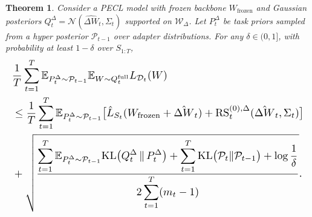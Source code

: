 \documentclass{article}
\theoremstyle{plain}
\newtheorem{theorem}{Theorem}[section]
\theoremstyle{definition}
\theoremstyle{remark}
\begin{document}
\begin{theorem}
\label{thm:pecl-bound}
Consider a PECL model with frozen backbone $W_{\mathrm{frozen}}$ and Gaussian posteriors 
$Q_t^\Delta = \mathcal N(\hat{\Delta W}_t,\Sigma_t)$ supported on $\mathcal W_\Delta$. 
Let $P_t^\Delta$ be task priors sampled from a hyper posterior $\mathcal P_{t-1}$ over adapter 
distributions. For any $\delta\in(0,1]$, with probability at least $1-\delta$ over $S_{1:T}$,
\begin{equation*}
\label{eq:pecl-main-bound}
\resizebox{\linewidth}{!}{$
\begin{aligned}
&\frac{1}{T}\sum_{t=1}^T
\mathbb E_{P_t^\Delta\sim\mathcal P_{t-1}}
\mathbb E_{W\sim Q_t^{\mathrm{full}}}
L_{\mathcal D_t}(W) \\
&\le
\frac{1}{T}\sum_{t=1}^T
\mathbb E_{P_t^\Delta\sim\mathcal P_{t-1}}
\bigl[
\hat L_{S_t}(W_{\mathrm{frozen}} + \hat{\Delta W}_t)
+
\mathrm{RS}_t^{(0),\Delta}(\hat{\Delta W}_t,\Sigma_t)
\bigr] \\
&+
\sqrt{
\frac{
\displaystyle
\sum_{t=1}^T
\mathbb E_{P_t^\Delta\sim\mathcal P_{t-1}}
\mathrm{KL}\bigl(Q_t^\Delta \,\Vert\, P_t^\Delta\bigr)
+
\sum_{t=1}^T
\mathrm{KL}\bigl(\mathcal P_t\Vert\mathcal P_{t-1}\bigr)
+
\log\frac{1}{\delta}}
{2\displaystyle\sum_{t=1}^T (m_t - 1)}
}.
\end{aligned}
$}
\end{equation*}
\end{theorem}

\end{document}
